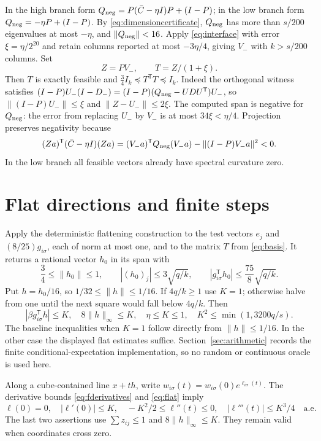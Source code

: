 \documentclass[11pt]{amsart}
\theoremstyle{remark}\newtheorem{remark}[theorem]{Remark}
\newcommand{\T}{\mathsf T}
\begin{document}
In the high branch form
$Q_{\rm neg}=P(\bar C-\eta I)P+(I-P)$; in the low branch form
$Q_{\rm neg}=-\eta P+(I-P)$.
By \eqref{eq:dimensioncertificate}, $Q_{\rm neg}$ has more than $s/200$
eigenvalues at most $-\eta$, and $\|Q_{\rm neg}\|<16$.
Apply \eqref{eq:interface} with error $\xi=\eta/2^{20}$ and retain
columns reported at most $-3\eta/4$, giving $V_-$ with $k>s/200$ columns.
Set
\begin{equation}\label{eq:basis}
 Z=PV_-,\qquad T=Z/(1+\xi).
\end{equation}
Then $T$ is exactly feasible and
$\frac34 I_k\preceq T^\T T\preceq I_k$.
Indeed the orthogonal witness satisfies
$(I-P)U_-(I-D_-)=(I-P)(Q_{\rm neg}-UDU^\T)U_-$,
so $\|(I-P)U_-\|\le\xi$ and $\|Z-U_-\|\le2\xi$.
The computed span is negative for $Q_{\rm neg}$: the error from replacing $U_-$ by
$V_-$ is at most $34\xi<\eta/4$.
Projection preserves negativity because
\[
 (Za)^\T(\bar C-\eta I)(Za)
 =(V_-a)^\T Q_{\rm neg}(V_-a)-\|(I-P)V_-a\|^2<0.
\]
In the low branch all feasible vectors already have spectral curvature zero.

\section{Flat directions and finite steps}\label{sec:steps}

Apply the deterministic flattening construction to the test vectors
$e_j$ and $(8/25)g_{i\sigma}$, each of norm at most one, and to the matrix
$T$ from \eqref{eq:basis}. It returns a rational vector $h_0$ in its span
with
\[
 \frac34\le\|h_0\|\le1,\qquad
 |(h_0)_j|\le3\sqrt{q/k},\qquad
 |g_{i\sigma}^\T h_0|\le\frac{75}{8}\sqrt{q/k}.
\]
Put $h=h_0/16$, so $1/32\le\|h\|\le1/16$.
If $4q/k\ge1$ use $K=1$; otherwise halve from one until the next square
would fall below $4q/k$. Then
\begin{equation}\label{eq:flat}
 |\beta g_{i\sigma}^\T h|\le K,\quad
 8\|h\|_\infty\le K,\quad
 \eta\le K\le1,\quad K^2\le\min(1,3200q/s).
\end{equation}
The baseline inequalities when $K=1$ follow directly from $\|h\|\le1/16$.
In the other case the displayed flat estimates suffice.
Section~\ref{sec:arithmetic} records the finite conditional-expectation
implementation, so no random or continuous oracle is used here.

Along a cube-contained line $x+th$, write
$w_{i\sigma}(t)=w_{i\sigma}(0)e^{\ell_{i\sigma}(t)}$.
The derivative bounds \eqref{eq:fderivatives} and \eqref{eq:flat} imply
\begin{equation}\label{eq:logcurve}
 \ell(0)=0,\quad |\ell'(0)|\le K,\quad
 -K^2/2\le\ell''(t)\le0,\quad
 |\ell'''(t)|\le K^3/4\quad\text{a.e.}
\end{equation}
The last two assertions use $\sum z_{ij}\le1$ and
$8\|h\|_\infty\le K$. They remain valid when coordinates cross zero.
\end{document}
